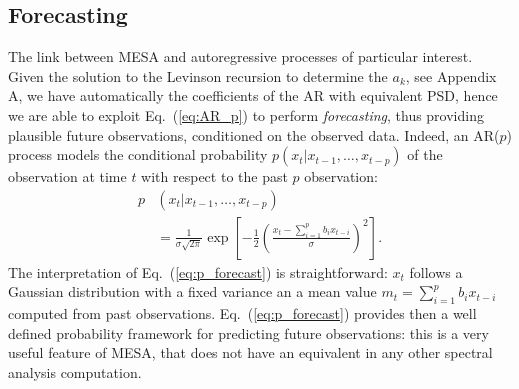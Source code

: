 \documentclass[twocolumn,showpacs,preprintnumbers,nofootinbib,prd,
superscriptaddress,10pt]{revtex4-1}
\begin{document}

\subsection{Forecasting} \label{sec:forecasting}
The link between MESA and autoregressive processes of particular interest. Given the solution to the Levinson recursion to determine the $a_k$, see Appendix A, we have automatically the coefficients of the AR with equivalent PSD, hence we are able to exploit Eq.~(\ref{eq:AR_p}) to perform \emph{forecasting}, thus providing plausible future observations, conditioned on the observed data.
Indeed, an AR($p$) process models the conditional probability $p(x_t|x_{t-1}, \ldots , x_{t-p})$ of the observation at time $t$ with respect to the past $p$ observation:
\begin{align}\label{eq:p_forecast}
	p&(x_t|x_{t-1}, \ldots , x_{t-p}) \nonumber\\
	&= \frac{1}{\sigma\sqrt{2\pi}} \exp\left[-\frac{1}{2} \left(\frac{x_t - \sum_{i = 1}^p b_i x_{t-i}}{\sigma}\right)^2\right].
\end{align}
The interpretation of Eq.~(\ref{eq:p_forecast}) is straightforward: $x_t$ follows a Gaussian distribution with a fixed variance an a mean value $m_t = \sum_{i = 1}^p b_i x_{t-i}$ computed from past observations.
Eq.~(\ref{eq:p_forecast}) provides then a well defined probability framework for predicting future observations: this is a very useful feature of MESA, that does not have an equivalent in any other spectral analysis computation.
\end{document}
